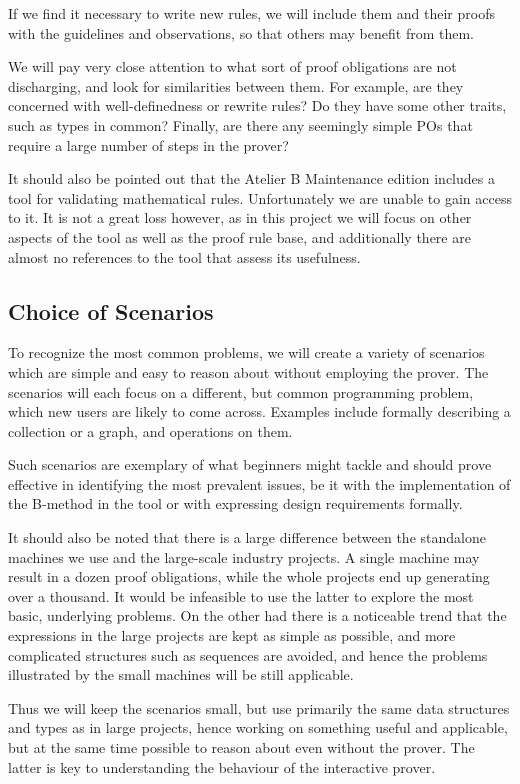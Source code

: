 \documentclass[11pt,journal]{IEEEtran}
\begin{document}
	If we find it necessary to write new rules, we will include them and their proofs with the guidelines and observations, so that others may benefit from them.
	
	We will pay very close attention to what sort of proof obligations are not discharging, and look for similarities between them. For example, are they concerned with well-definedness or rewrite rules? Do they have some other traits, such as types in common? Finally, are there any seemingly simple POs that require a large number of steps in the prover?

	
	It should also be pointed out that the Atelier B Maintenance edition includes a tool for validating mathematical rules. Unfortunately we are unable to gain access to it. It is not a great loss however, as in this project we will focus on other aspects of the tool as well as the proof rule base, and additionally there are almost no references to the tool that assess its usefulness.
	
	
	
	
	\subsection{Choice of Scenarios}
	To recognize the most common problems, we will create a variety of scenarios which are simple and easy to reason about without employing the prover. The scenarios will each focus on a different, but common programming problem, which new users are likely to come across. Examples include formally describing a collection or a graph, and operations on them. 
	
	Such scenarios are exemplary of what beginners might tackle and should prove effective in identifying the most prevalent issues, be it with the implementation of the B-method in the tool or with expressing design requirements formally.
	
	It should also be noted that there is a large difference between the standalone machines we use and the large-scale industry projects. A single machine may result in a dozen proof obligations, while the whole projects end up generating over a thousand. It would be infeasible to use the latter to explore the most basic, underlying problems. On the other had there is a noticeable trend that the expressions in the large projects are kept as simple as possible, and more complicated structures such as sequences are avoided, and hence the problems illustrated by the small machines will be still applicable.
	
	Thus we will keep the scenarios small, but use primarily the same data structures and types as in large projects, hence working on something useful and applicable, but at the same time possible to reason about even without the prover. The latter is key to understanding the behaviour of the interactive prover.
\end{document}
